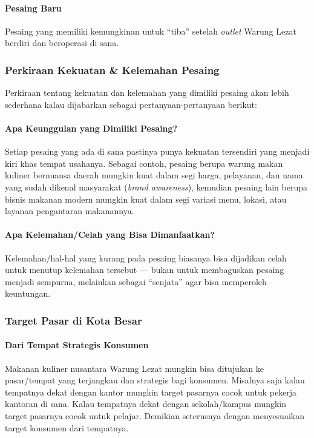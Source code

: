 \paragraph{Pesaing Baru}

Pesaing yang memiliki kemungkinan untuk “tiba” setelah \textit{outlet} Warung Lezat berdiri dan beroperasi di sana.

\subsubsection{Perkiraan Kekuatan \& Kelemahan Pesaing}

Perkiraan tentang kekuatan dan kelemahan yang dimiliki pesaing akan lebih sederhana kalau dijabarkan sebagai pertanyaan-pertanyaan berikut:

\paragraph{Apa Keunggulan yang Dimiliki Pesaing?}

Setiap pesaing yang ada di sana pastinya punya kekuatan tersendiri yang menjadi kiri khas tempat usahanya. Sebagai contoh, pesaing berupa warung makan kuliner bernuansa daerah mungkin kuat dalam segi harga, pelayanan, dan nama yang sudah dikenal masyarakat (\textit{brand awareness}), kemudian pesaing lain berupa bisnis makanan modern mungkin kuat dalam segi variasi menu, lokasi, atau layanan pengantaran makanannya.

\paragraph{Apa Kelemahan/Celah yang Bisa Dimanfaatkan?}

Kelemahan/hal-hal yang kurang pada pesaing biasanya bisa dijadikan celah untuk menutup kelemahan tersebut — bukan untuk membaguskan pesaing menjadi sempurna, melainkan sebagai “senjata” agar bisa memperoleh keuntungan.

\subsubsection{Target Pasar di Kota Besar}

\paragraph{Dari Tempat Strategis Konsumen}

Makanan kuliner nusantara Warung Lezat mungkin bisa ditujukan ke pasar/tempat yang terjangkau dan strategis bagi konsumen. Misalnya saja kalau tempatnya dekat dengan kantor mungkin target pasarnya cocok untuk pekerja kantoran di sana. Kalau tempatnya dekat dengan sekolah/kampus mungkin target pasarnya cocok untuk pelajar. Demikian seterusnya dengan menyesuaikan target konsumen dari tempatnya.

